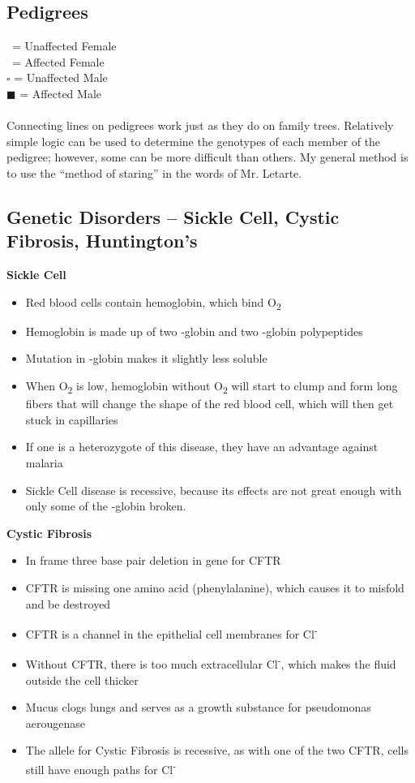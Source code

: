 \documentclass{article}
\begin{document}
\subsection{Pedigrees}
\Circle \ = Unaffected Female\\
\CIRCLE \ = Affected Female\\
$\square$ = Unaffected Male\\
$\blacksquare$ = Affected Male\\
\\
Connecting lines on pedigrees work just as they do on family trees.
Relatively simple logic can be used to determine the genotypes of each member of the pedigree; however, some can be more difficult than others.
My general method is to use the ``method of staring'' in the words of Mr. Letarte.

\subsection{Genetic Disorders -- Sickle Cell, Cystic Fibrosis, Huntington's}
\textbf{Sickle Cell}
\begin{itemize}
\item Red blood cells contain hemoglobin, which bind O\textsubscript{2}
\item Hemoglobin is made up of two 
\textalpha -globin and two \textbeta -globin polypeptides
\item Mutation in \textbeta -globin makes it slightly less soluble
\item When O\textsubscript{2} is low, hemoglobin without O\textsubscript{2} will start to
clump and form long fibers that will change the shape of the red blood cell, which will then get stuck in capillaries
\item If one is a heterozygote of this disease, they have an advantage against malaria
\item Sickle Cell disease is recessive, because its effects are not great enough with only some of the \textbeta -globin broken.
\end{itemize}

\textbf{Cystic Fibrosis}
\begin{itemize}
\item In frame three base pair deletion in gene for CFTR
\item CFTR is missing one amino acid (phenylalanine), which causes it to misfold and be
destroyed
\item CFTR is a channel in the epithelial cell membranes for Cl\textsuperscript{-}
\item Without CFTR, there is too much extracellular Cl\textsuperscript{-}, which makes the fluid outside the cell thicker
\item Mucus clogs lungs and serves as a growth substance for pseudomonas aerougenase
\item The allele for Cystic Fibrosis is recessive, as with one of the two CFTR, cells still have enough paths for Cl\textsuperscript{-}
\end{itemize}
\end{document}
